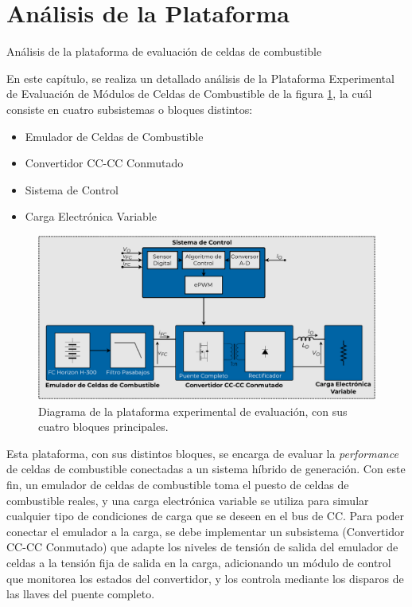 \section{Análisis de la Plataforma}
\thispagestyle{plain}

\vspace{0.5cm}

\Large\scshape
\begin{center}
    {\Medium Análisis de la plataforma de evaluación de celdas de combustible}
\end{center}
\normalfont

\divider

En este capítulo, se realiza un detallado análisis de la Plataforma Experimental de Evaluación de Módulos de Celdas de Combustible de la figura \ref{diag_plataforma}, la cuál consiste en cuatro subsistemas o bloques distintos: 

\begin{itemize}
    \Medium \item Emulador de Celdas de Combustible
    \Medium \item Convertidor CC-CC Conmutado
    \Medium \item Sistema de Control
    \Medium \item Carga Electrónica Variable
\end{itemize}

\begin{figure}[h]
    \centering
    \includegraphics[scale=0.4]{Imagenes/Plataforma Experimental.pdf}
    \caption{Diagrama de la plataforma experimental de evaluación, con sus cuatro bloques principales.}
    \label{diag_plataforma}
\end{figure}

Esta plataforma, con sus distintos bloques, se encarga de evaluar la \textit{performance} de celdas de combustible conectadas a un sistema híbrido de generación. Con este fin, un emulador de celdas de combustible toma el puesto de celdas de combustible reales, y una carga electrónica variable se utiliza para simular cualquier tipo de condiciones de carga que se deseen en el bus de CC. Para poder conectar el emulador a la carga, se debe implementar un subsistema (Convertidor CC-CC Conmutado) que adapte los niveles de tensión de salida del emulador de celdas a la tensión fija de salida en la carga, adicionando un módulo de control que monitorea los estados del convertidor, y los controla mediante los disparos de las llaves del puente completo.\\


